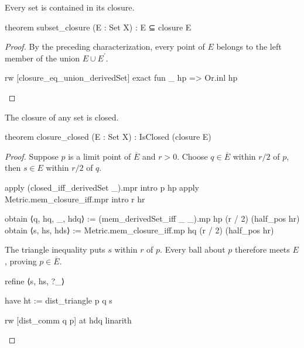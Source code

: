 \begin{lemma}
  \label{ma:lem:subset-closure}
  Every set is contained in its closure.

  \begin{lean}
    theorem subset_closure (E : Set X) : E ⊆ closure E
  \end{lean}
\end{lemma}

\begin{proof}
  By the preceding characterization, every point of $E$ belongs to the left member of the union
  $E\cup E^{\prime}$.

  \begin{lean}
    rw [closure_eq_union_derivedSet]
    exact fun _ hp => Or.inl hp
  \end{lean}

\end{proof}

\begin{lemma}
  \label{ma:lem:closure-closed}
  The closure of any set is closed.

  \begin{lean}
    theorem closure_closed (E : Set X) : IsClosed (closure E)
  \end{lean}
\end{lemma}

\begin{proof}
  Suppose $p$ is a limit point of $\overline E$ and $r>0$.
  Choose $q\in\overline E$ within $r/2$ of $p$, then $s\in E$ within $r/2$ of $q$.

  \begin{lean}
    apply (closed_iff_derivedSet _).mpr
    intro p hp
    apply Metric.mem_closure_iff.mpr
    intro r hr

    obtain ⟨q, hq, _, hdq⟩ := (mem_derivedSet_iff _ _).mp hp (r / 2) (half_pos hr)
    obtain ⟨s, hs, hds⟩ := Metric.mem_closure_iff.mp hq (r / 2) (half_pos hr)
  \end{lean}

  The triangle inequality puts $s$ within $r$ of $p$.
  Every ball about $p$ therefore meets $E$, proving $p\in\overline E$.

  \begin{lean}
    refine ⟨s, hs, ?_⟩

    have ht := dist_triangle p q s

    rw [dist_comm q p] at hdq
    linarith
  \end{lean}
\end{proof}

